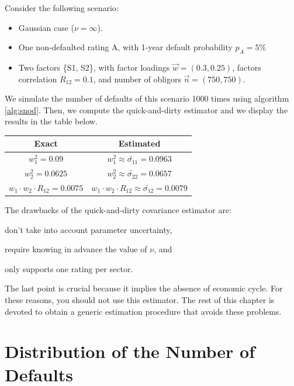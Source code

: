 \documentclass[11pt,fleqn]{book} %
\begin{document}
\begin{example}
	Consider the following scenario:
	\begin{itemize}
		\item Gaussian case ($\nu = \infty$).
		\item One non-defaulted rating A, with 1-year default probability $p_A=5\%$
		\item Two factors \{S1, S2\}, with factor loadings $\vec{w} = (0.3, 0.25)$, 
		factors correlation $R_{12} = 0.1$, and number of obligors $\vec{n} = (750, 750)$.
	\end{itemize}
	We simulate the number of defaults of this scenario 1000 times using algorithm 
	\ref{alg:snod}. Then, we compute the quick-and-dirty estimator and we display the 
	results in the table below.

	\hspace*{1cm}
	\begin{tabular}{|c|c|}
		\hline
		Exact & Estimated \\
		\hline
		$w_1^2 = 0.09$ & $w_1^2 \approx \widetilde{\sigma_{11}} = 0.0963$ \\
		\hline
		$w_2^2 = 0.0625$ & $w_2^2 \approx \widetilde{\sigma_{22}} = 0.0657$ \\
		\hline
		$w_1 \cdot w_2 \cdot R_{12} = 0.0075$ & $w_1 \cdot w_2 \cdot R_{12} \approx \widetilde{\sigma_{12}} = 0.0079$ \\
		\hline
	\end{tabular}
\end{example}

The drawbacks of the quick-and-dirty covariance estimator are:
\begin{inparaenum}[1)]
	\item don't take into account parameter uncertainty, 
	\item require knowing in advance the value of $\nu$, and
	\item only supports one rating per sector.
\end{inparaenum}
The last point is crucial because it implies the absence of economic cycle. 
For these reasons, you should not use this estimator. The rest of this chapter 
is devoted to obtain a generic estimation procedure that avoids these problems.

\section{Distribution of the Number of Defaults}
\end{document}
